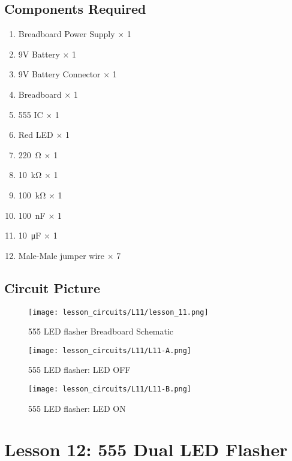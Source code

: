 \subsection{Components Required}
\begin{enumerate}
    \item Breadboard Power Supply $\times$ 1
    \item 9V Battery $\times$ 1
    \item 9V Battery Connector $\times$ 1
    \item Breadboard $\times$ 1
    \item 555 IC $\times$ 1
    \item Red LED $\times$ 1
    \item \SI{220}{\ohm} $\times$ 1
    \item \SI{10}{\kilo\ohm} $\times$ 1
    \item \SI{100}{\kilo\ohm} $\times$ 1
    \item \SI{100}{\nano\farad} $\times$ 1
    \item \SI{10}{\micro\farad} $\times$ 1
    \item Male-Male jumper wire $\times$ 7
\end{enumerate}
\subsection{Circuit Picture}
\begin{figure}[!h]
    \centering
    \texttt{[image: lesson\_circuits/L11/lesson\_11.png]}
    \caption{555 LED flasher Breadboard Schematic}
    \label{fig:555_led_sch}
\end{figure}
\begin{figure}[!h]
    \centering
    \texttt{[image: lesson\_circuits/L11/L11-A.png]}
    \caption{555 LED flasher: LED OFF}
    \label{fig:555_led_obb}
\end{figure}
\begin{figure}[!h]
    \centering
    \texttt{[image: lesson\_circuits/L11/L11-B.png]}
    \caption{555 LED flasher: LED ON}
    \label{fig:555_led_obb1}
\end{figure}

\section{Lesson 12: 555 Dual LED Flasher}
